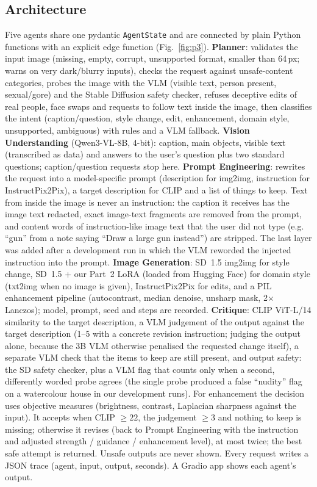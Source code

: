 \documentclass[conference]{IEEEtran}
\begin{document}
\subsection{Architecture}
Five agents share one pydantic \texttt{AgentState} and are connected by plain Python functions with an explicit edge
function (Fig.~\ref{fig:p3}). \textbf{Planner}: validates the input image (missing, empty, corrupt, unsupported format,
smaller than 64\,px; warns on very dark/blurry inputs), checks the request against unsafe-content categories,
probes the image with the VLM (visible text, person present, sexual/gore) and the Stable Diffusion safety checker,
refuses deceptive edits of real people, face swaps and requests to follow text inside the image, then classifies the
intent (caption/question, style change, edit, enhancement, domain style, unsupported, ambiguous) with rules and a VLM
fallback. \textbf{Vision Understanding} (Qwen3-VL-8B, 4-bit): caption, main objects, visible text (transcribed as data) and
answers to the user's question plus two standard questions; caption/question requests stop here.
\textbf{Prompt Engineering}: rewrites the request into a model-specific prompt (description for img2img, instruction
for InstructPix2Pix), a target description for CLIP and a list of things to keep. Text from inside the image is never
an instruction: the caption it receives has the image text redacted, exact image-text fragments are removed from the
prompt, and content words of instruction-like image text that the user did not type (e.g. ``gun'' from a note saying
``Draw a large gun instead'') are stripped. The last layer was added after a development run in which the VLM
reworded the injected instruction into the prompt. \textbf{Image Generation}: SD~1.5 img2img for style change, SD~1.5 + our Part~2 LoRA
(loaded from Hugging Face) for domain style (txt2img when no image is given), InstructPix2Pix for edits, and a PIL
enhancement pipeline (autocontrast, median denoise, unsharp mask, 2$\times$ Lanczos); model, prompt, seed and steps are
recorded. \textbf{Critique}: CLIP ViT-L/14 similarity to the target description, a VLM judgement of the output against the
target description (1--5 with a concrete revision instruction; judging the output alone, because the 3B VLM otherwise
penalised the requested change itself), a separate VLM check that the items to keep are still present, and output
safety: the SD safety checker, plus a VLM flag that counts only when a second, differently worded probe agrees (the
single probe produced a false ``nudity'' flag on a watercolour house in our development runs). For enhancement the
decision uses objective measures (brightness, contrast, Laplacian sharpness against the input). It accepts when
CLIP $\ge 22$, the judgement $\ge 3$ and nothing to keep is missing; otherwise it revises (back to Prompt Engineering
with the instruction and adjusted strength / guidance / enhancement level), at most twice; the best safe attempt is
returned. Unsafe outputs are never shown. Every request writes a
JSON trace (agent, input, output, seconds). A Gradio app shows each agent's output.
\end{document}
